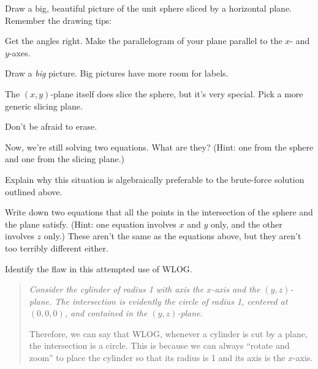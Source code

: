 \documentclass[12pt]{exam}
\begin{document}
\begin{questions}

\question Draw a big, beautiful picture of the unit sphere sliced by a horizontal plane. Remember the drawing tips:
\begin{compactitem}
    \item Get the angles right. Make the parallelogram of your plane parallel to the $x$- and $y$-axes.
    \item Draw a \emph{big} picture. Big pictures have more room for labels.
    \item The $(x,y)$-plane itself does slice the sphere, but it's very special. Pick a more generic slicing plane.
    \item Don't be afraid to erase.
\end{compactitem}

\newpage

\question Now, we're still solving two equations. What are they? (Hint: one from the sphere and one from the slicing plane.)


\question Explain why this situation is algebraically preferable to the brute-force solution outlined above.


\question Write down two equations that all the points in the intersection of the sphere and the plane satisfy. (Hint: one equation involves $x$ and $y$ only, and the other involves $z$ only.) These aren't the same as the equations above, but they aren't too terribly different either.


\question Identify the flaw in this attempted use of WLOG.

\begin{quote}
    {\em Consider the cylinder of radius 1 with axis the $x$-axis and the $(y,z)$-plane. The intersection is evidently the circle of radius 1, centered at $(0,0,0)$, and contained in the $(y,z)$-plane. 

    Therefore, we can say that WLOG, whenever a cylinder is cut by a plane, the intersection is a circle. This is because we can always ``rotate and zoom'' to place the cylinder so that its radius is 1 and its axis is the $x$-axis.}
\end{quote}


\end{questions} 
\end{document}

